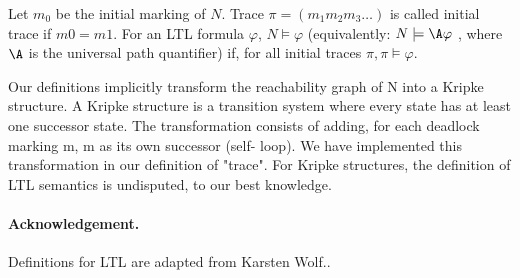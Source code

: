\documentclass{article}
\begin{document}
Let $m_0$ be the initial marking of $N$.
Trace $\pi = (m_1 m_2 m_3 \ldots)$ is called initial trace if $m0 = m1$.
For an LTL formula $\varphi$, $N \models \varphi$ (equivalently: $N \models \A \varphi$ , where $\A$ is the
universal path quantifier) if, for all initial traces $\pi, \pi \models \varphi$.



Our definitions implicitly transform the reachability graph of N into a
Kripke structure. A Kripke structure is a transition system where every
state has at least one successor state. The transformation consists of
adding, for each deadlock marking m, m as its own successor (self-
loop). We have implemented this transformation in our definition of
"trace". For Kripke structures, the definition of LTL semantics is
undisputed, to our best knowledge.

\paragraph{Acknowledgement.} Definitions for LTL are adapted from Karsten Wolf..




\end{document}
